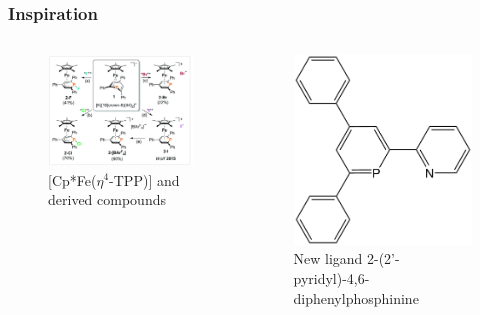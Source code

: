 \documentclass[10pt,aspectratio=43]{beamer}
\numberwithin{equation}{section}
\begin{document}
\begin{frame}
\frametitle{Inspiration}
\begin{columns}
	\begin{figure}
		\includegraphics[width=\linewidth]{Fe-TPP.jpg}
		\caption{[Cp*Fe($ \eta^4 $-TPP)] and derived compounds
		\footnotesize{}}
	\end{figure}
    \begin{figure}
    	\includegraphics[width=0.7\linewidth]{L.png}
    	\caption{New ligand    2-(2'-pyridyl)-4,6-diphenylphosphinine}
    \end{figure}
\end{columns}

	

\end{frame}
\end{document}
